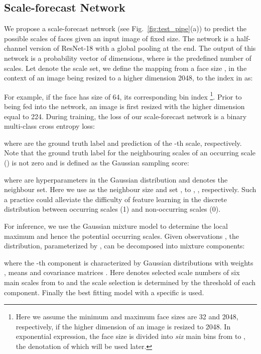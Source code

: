 \documentclass[10pt,twocolumn,letterpaper]{article}
\begin{document}
\subsection{Scale-forecast Network}\label{sec:scale-forecast-network}
We propose a scale-forecast network (see Fig.~\ref{fig:test_pipe}(a)) to predict the possible scales of faces given an input image of  fixed size.
The network is a half-channel version of ResNet-18 with a global pooling at the end. The output of this network is a probability vector of  dimensions, where  is the predefined number of scales. 
Let  denote the scale set, we define the mapping from a face size , in the context of an image being resized to a higher dimension 2048, to the index  in  as:

For example, if the face has size of 64, its corresponding bin index \footnote{Here we assume the minimum and maximum face sizes are 32 and 2048, respectively, if the higher dimension of an image is resized to 2048. In exponential expression, the face size is divided into \textit{six} main bins from  to , the denotation of which  will be used later.}.
Prior to being fed into the network, an image is first resized with the higher dimension equal to 224. During training,  the loss of our scale-forecast network is a binary multi-class cross entropy loss:

where
 are the ground truth label and prediction of the -th scale, respectively.
Note that the ground truth label for the neighbouring scales  of an occurring scale  () is not zero and is defined as the Gaussian sampling score:

where  are hyperparameters in the Gaussian distribution and  denotes the neighbour set. Here we use  as the neighbour size and set ,  to , , respectively. Such a practice could alleviate the difficulty of feature learning in the discrete distribution between occurring scales (1) and non-occurring scales (0). 

For inference, we use the Gaussian mixture model to determine the local maximum and hence the potential occurring scales.  
Given observations , the distribution, parameterized by , can be decomposed into  mixture components:

where the -th component is characterized by Gaussian distributions with weights , means  and covariance matrices . Here  denotes selected scale numbers of six main scales from  to  and the scale selection is determined by the threshold  of each component. Finally the best fitting model with a specific  is used. 
\end{document}
